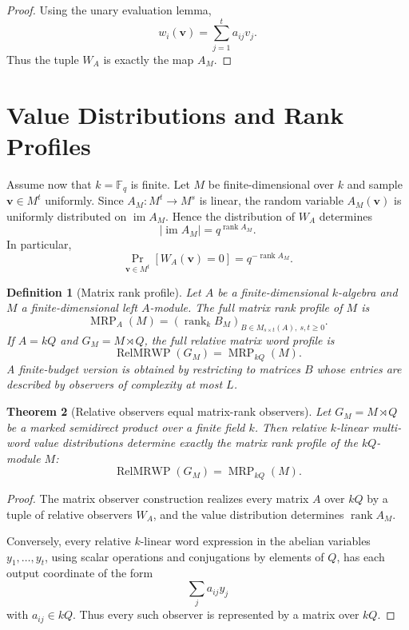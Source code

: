\documentclass[11pt]{article}
\newtheorem{theorem}{Theorem}[section]
\newtheorem{definition}[theorem]{Definition}
\begin{document}
\begin{proof}
Using the unary evaluation lemma,
\[
w_i(\mathbf v)=\sum_{j=1}^t a_{ij}v_j.
\]
Thus the tuple $W_A$ is exactly the map $A_M$.
\end{proof}

\section{Value Distributions and Rank Profiles}

Assume now that $k=\mathbb F_q$ is finite. Let $M$ be finite-dimensional over $k$ and sample $\mathbf v\in M^t$ uniformly. Since $A_M:M^t\to M^s$ is linear, the random variable $A_M(\mathbf v)$ is uniformly distributed on $\operatorname{im}A_M$. Hence the distribution of $W_A$ determines
\[
|\operatorname{im}A_M|=q^{\operatorname{rank}A_M}.
\]
In particular,
\[
\Pr_{\mathbf v\in M^t}[W_A(\mathbf v)=0]
=q^{-\operatorname{rank}A_M}.
\]

\begin{definition}[Matrix rank profile]
Let $A$ be a finite-dimensional $k$-algebra and $M$ a finite-dimensional left $A$-module. The full matrix rank profile of $M$ is
\[
\operatorname{MRP}_A(M)
=
\left(
\operatorname{rank}_k B_M
\right)_{B\in M_{s\times t}(A),\ s,t\ge0}.
\]
If $A=kQ$ and $G_M=M\rtimes Q$, the full relative matrix word profile is
\[
\operatorname{RelMRWP}(G_M)=\operatorname{MRP}_{kQ}(M).
\]
A finite-budget version is obtained by restricting to matrices $B$ whose entries are described by observers of complexity at most $L$.
\end{definition}

\begin{theorem}[Relative observers equal matrix-rank observers]
Let $G_M=M\rtimes Q$ be a marked semidirect product over a finite field $k$. Then relative $k$-linear multi-word value distributions determine exactly the matrix rank profile of the $kQ$-module $M$:
\[
\operatorname{RelMRWP}(G_M)=\operatorname{MRP}_{kQ}(M).
\]
\end{theorem}

\begin{proof}
The matrix observer construction realizes every matrix $A$ over $kQ$ by a tuple of relative observers $W_A$, and the value distribution determines $\operatorname{rank}A_M$.

Conversely, every relative $k$-linear word expression in the abelian variables $y_1,\ldots,y_t$, using scalar operations and conjugations by elements of $Q$, has each output coordinate of the form
\[
\sum_j a_{ij}y_j
\]
with $a_{ij}\in kQ$. Thus every such observer is represented by a matrix over $kQ$.
\end{proof}
\end{document}
